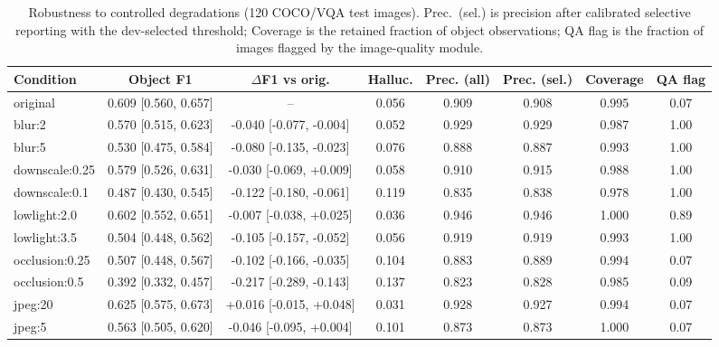 \begin{table}[!t]
\centering
\scriptsize
\caption{Robustness to controlled degradations (120 COCO/VQA test images). Prec.~(sel.) is precision after calibrated selective reporting with the dev-selected threshold; Coverage is the retained fraction of object observations; QA flag is the fraction of images flagged by the image-quality module.}
\label{tab:exp5}
\begin{adjustbox}{max width=\textwidth}
\begin{tabular}{lccccccc}
\toprule
Condition & Object F1 & $\Delta$F1 vs orig. & Halluc. & Prec. (all) & Prec. (sel.) & Coverage & QA flag \\
\midrule
original & 0.609 [0.560, 0.657] & -- & 0.056 & 0.909 & 0.908 & 0.995 & 0.07 \\
blur:2 & 0.570 [0.515, 0.623] & -0.040 [-0.077, -0.004] & 0.052 & 0.929 & 0.929 & 0.987 & 1.00 \\
blur:5 & 0.530 [0.475, 0.584] & -0.080 [-0.135, -0.023] & 0.076 & 0.888 & 0.887 & 0.993 & 1.00 \\
downscale:0.25 & 0.579 [0.526, 0.631] & -0.030 [-0.069, +0.009] & 0.058 & 0.910 & 0.915 & 0.988 & 1.00 \\
downscale:0.1 & 0.487 [0.430, 0.545] & -0.122 [-0.180, -0.061] & 0.119 & 0.835 & 0.838 & 0.978 & 1.00 \\
lowlight:2.0 & 0.602 [0.552, 0.651] & -0.007 [-0.038, +0.025] & 0.036 & 0.946 & 0.946 & 1.000 & 0.89 \\
lowlight:3.5 & 0.504 [0.448, 0.562] & -0.105 [-0.157, -0.052] & 0.056 & 0.919 & 0.919 & 0.993 & 1.00 \\
occlusion:0.25 & 0.507 [0.448, 0.567] & -0.102 [-0.166, -0.035] & 0.104 & 0.883 & 0.889 & 0.994 & 0.07 \\
occlusion:0.5 & 0.392 [0.332, 0.457] & -0.217 [-0.289, -0.143] & 0.137 & 0.823 & 0.828 & 0.985 & 0.09 \\
jpeg:20 & 0.625 [0.575, 0.673] & +0.016 [-0.015, +0.048] & 0.031 & 0.928 & 0.927 & 0.994 & 0.07 \\
jpeg:5 & 0.563 [0.505, 0.620] & -0.046 [-0.095, +0.004] & 0.101 & 0.873 & 0.873 & 1.000 & 0.07 \\
\bottomrule
\end{tabular}
\end{adjustbox}
\end{table}
